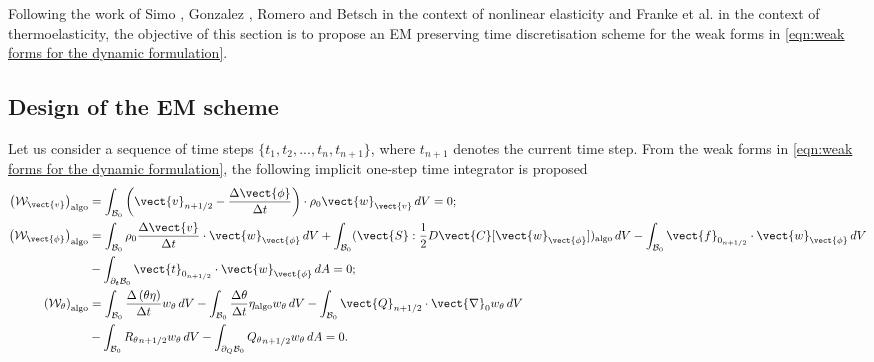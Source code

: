 Following the work of Simo  \cite{Simo_EM_1992}, Gonzalez \cite{Gonzalez_EM_2000}, Romero \cite{Romero2012} and Betsch \cite{Betsch_EM_mixed_2017,betsch2016} in the context of nonlinear elasticity and Franke et al. \cite{Betsch2018Thermo} in the context of thermoelasticity, the objective of this section is to propose an EM preserving time discretisation scheme for the weak forms in \eqref{eqn:weak forms for the dynamic formulation}.

\subsection{Design of the EM scheme}\label{sec:design of the time integrator}



Let us consider a sequence of time steps $\{t_1,t_2,...,t_n,t_{n+1}\}$, where $t_{n+1}$ denotes the current time step. 
From the weak forms in \eqref{eqn:weak forms for the dynamic formulation}, the following implicit one-step time integrator is proposed 
%
\begin{equation}\label{eqn:weak forms for proposed time integrator}
\begin{aligned}
\left(\mathcal{W}_{\vect{v}}\right)_{\text{algo}}&=\int_{\mathcal{B}_0}\left(\vect{v}_{n+1/2} - \frac{\Delta\vect{\phi}}{\Delta t}\right)\cdot\rho_0\vect{w}_{\vect{v}}\,dV = 0;\\
%
\left(\mathcal{W}_{\vect{\phi}}\right)_{\text{algo}}&=\int_{\mathcal{B}_0}\rho_0\frac{\Delta\vect{v}}{\Delta t}\cdot\vect{w}_{\vect{\phi}}\,dV + \int_{\mathcal{B}_0}(\vect{S}:\frac{1}{2}D\vect{C}[\vect{w}_{\vect{\phi}}])_{\text{algo}}\,dV-  \int_{\mathcal{B}_0}\vect{f}_{0_{n+1/2}}\cdot\vect{w}_{\vect{\phi}}\,dV\\&-
\int_{\partial_{\boldsymbol{t}}\mathcal{B}_0}\vect{t}_{0_{n+1/2}}\cdot\vect{w}_{\vect{\phi}}\,dA = 0;\\
%
\left(\mathcal{W}_{\theta}\right)_{\text{algo}}&=  \int_{\mathcal{B}_0}\frac{\Delta\left(\theta\eta\right)}{\Delta t}w_{\theta}\,dV - \int_{\mathcal{B}_0}\frac{\Delta \theta}{\Delta t}\eta_{\text{algo}}w_{\theta}\,dV - \int_{\mathcal{B}_0}\vect{Q}_{n+1/2}\cdot\vect{\nabla}_0w_{\theta}\,dV\\& - \int_{\mathcal{B}_0}{R_{\theta}}_{n+1/2}w_{\theta}\,dV - \int_{\partial_{Q}\mathcal{B}_{0}}{Q_{\theta}}_{n+1/2}w_{\theta}\,dA = 0.
%
\end{aligned}
\end{equation}

